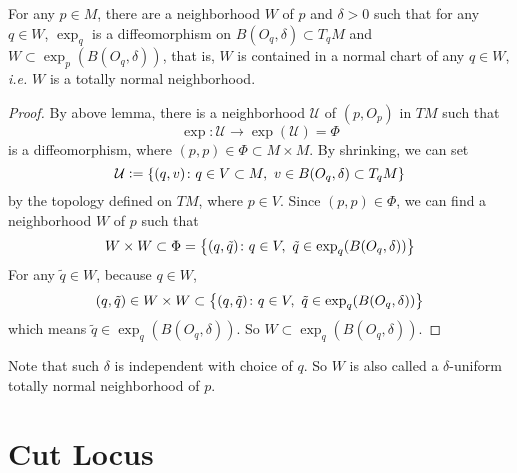 \begin{thm}
	For any $p \in M$, there are a neighborhood $W$ of $p$ and $\delta > 0$ such that for any $q \in W$, $\exp_q$ is a diffeomorphism on $B(O_q,\delta) \subset T_qM$ and $W \subset \exp_p(B(O_q,\delta))$, that is, $W$ is contained in a normal chart of any $q \in W$, \emph{i.e.} $W$ is a totally normal neighborhood.
\end{thm}
\begin{proof}
	By above lemma, there is a neighborhood $\mathcal{U}$ of $(p,O_p)$ in $TM$ such that
	\begin{equation*}
		\exp \colon \mathcal{U} \longrightarrow \exp(\mathcal{U}) = \Phi 
	\end{equation*}
	is a diffeomorphism, where $(p,p) \in \Phi \subset M \times M$. By shrinking, we can set
	\begin{equation*}
		\mathcal{U} \vcentcolon= \left\{(q,v) \colon q \in V \subset M,~v \in B(O_q,\delta) \subset T_qM\right\}
	\end{equation*}
	by the topology defined on $TM$, where $p \in V$. Since $(p,p) \in \Phi$, we can find a neighborhood $W$ of $p$ such that
	\begin{equation*}
		W \times W \subset \Phi = \left\{(q,\tilde{q}) \colon q \in V,~\tilde{q} \in \exp_q(B(O_q,\delta))\right\}
	\end{equation*}
	For any $\tilde{q} \in W$, because $q \in W$,
	\begin{equation*}
		(q,\tilde{q}) \in W \times W \subset \left\{(q,\tilde{q}) \colon q \in V,~\tilde{q} \in \exp_q(B(O_q,\delta))\right\}
	\end{equation*}
	which means $\tilde{q} \in \exp_q(B(O_q,\delta))$. So $W \subset \exp_q(B(O_q,\delta))$.
\end{proof}
\begin{rmk}
    Note that such $\delta$ is independent with choice of $q$. So $W$ is also called a $\delta$-uniform totally normal neighborhood of $p$.
\end{rmk}

\section{Cut Locus}

